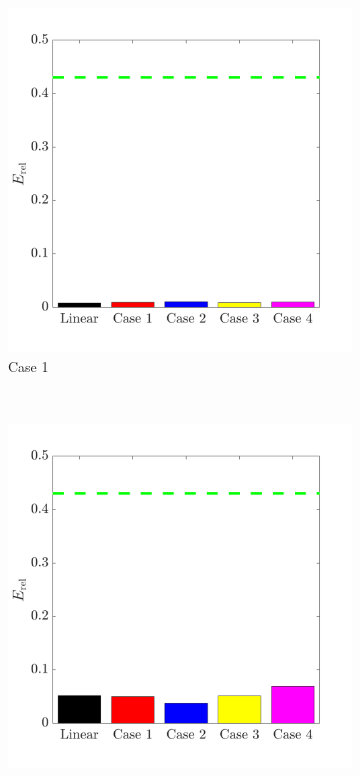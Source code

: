 \documentclass{jov}
\begin{document}
\begin{figure}
\centering
\begin{subfigure}{0.22 \textwidth}
	\includegraphics[width=\textwidth]{../Figures/Figure14/Figure14_a.pdf}
	\caption{Case 1}
	\label{fig:case1Bar}
    \end{subfigure}
    ~ 
    \begin{subfigure}{0.22 \textwidth}   
	\includegraphics[width=\textwidth]{../Figures/Figure14/Figure14_b.pdf}

\end{subfigure}
\end{figure}
\end{document}
